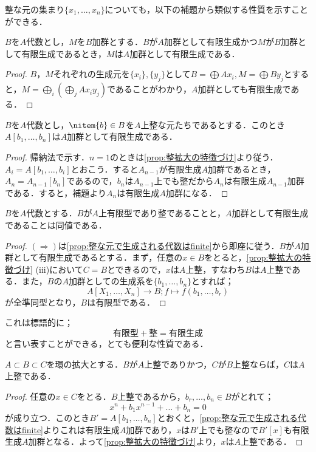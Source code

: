 整な元の集まり$\{x_1,\dots,x_n\}$についても，以下の補題から類似する性質を示すことができる．
\begin{lem}
	$B$を$A$代数とし，$M$を$B$加群とする．$B$が$A$加群として有限生成かつ$M$が$B$加群として有限生成であるとき，$M$は$A$加群として有限生成である．
\end{lem}
\begin{proof}
	$B，M$それぞれの生成元を$\{x_i\},\{y_j\}$として$B=\bigoplus Ax_i,M=\bigoplus By_j$とすると，$M=\bigoplus_i \left(\bigoplus_j Ax_iy_j\right)$であることがわかり，$A$加群としても有限生成である．
\end{proof}

\begin{prop}\label{prop:整な元で生成される代数はfinite}
	$B$を$A$代数とし，$\nitem{b}\in B$を$A$上整な元たちであるとする．このとき$A[b_1,\dots,b_n]$は$A$加群として有限生成である．
\end{prop}
\begin{proof}
	帰納法で示す．$n=1$のときは\ref{prop:整拡大の特徴づけ}より従う．$A_i=A[b_1,\dots,b_i]$とおこう．すると$A_{n-1}$が有限生成$A$加群であるとき，$A_n=A_{n-1}[b_n]$であるので，$b_n$は$A_{n-1}$上でも整だから$A_n$は有限生成$A_{n-1}$加群である．すると，補題より$A_n$は有限生成$A$加群になる．
\end{proof}

\begin{prop}
	$B$を$A$代数とする．$B$が$A$上有限型であり整であることと，$A$加群として有限生成であることは同値である．
\end{prop}

\begin{proof}
	$(\Longrightarrow)$は\ref{prop:整な元で生成される代数はfinite}から即座に従う．$B$が$A$加群として有限生成であるとする．まず，任意の$x\in B$をとると，\ref{prop:整拡大の特徴づけ} (iii)において$C=B$とできるので，$x$は$A$上整，すなわち$B$は$A$上整である．また，$B$の$A$加群としての生成系を$\{b_1,\dots,b_n\}$とすれば；
	\[A[X_1,\dots,X_n]\to B;f\mapsto f(b_1,\dots,b_r)\]
	が全準同型となり，$B$は有限型である．
\end{proof}

これは標語的に；
\[\text{有限型}+\text{整}=\text{有限生成}\]
と言い表すことができる，とても便利な性質である．

\begin{prop}[整従属の推移性]
	$A\subset B\subset C$を環の拡大とする．$B$が$A$上整でありかつ，$C$が$B$上整ならば，$C$は$A$上整である．
\end{prop}

\begin{proof}
	任意の$x\in C$をとる．$B$上整であるから，$b_r,\dots,b_n\in B$がとれて；
	\[x^n+b_1x^{n-1}+\dots+b_n=0\]
	が成り立つ．このとき$B'=A[b_1,\dots,b_n]$とおくと，\ref{prop:整な元で生成される代数はfinite}よりこれは有限生成$A$加群であり，$x$は$B'$上でも整なので$B'[x]$も有限生成$A$加群となる．よって\ref{prop:整拡大の特徴づけ}より，$x$は$A$上整である．
\end{proof}
